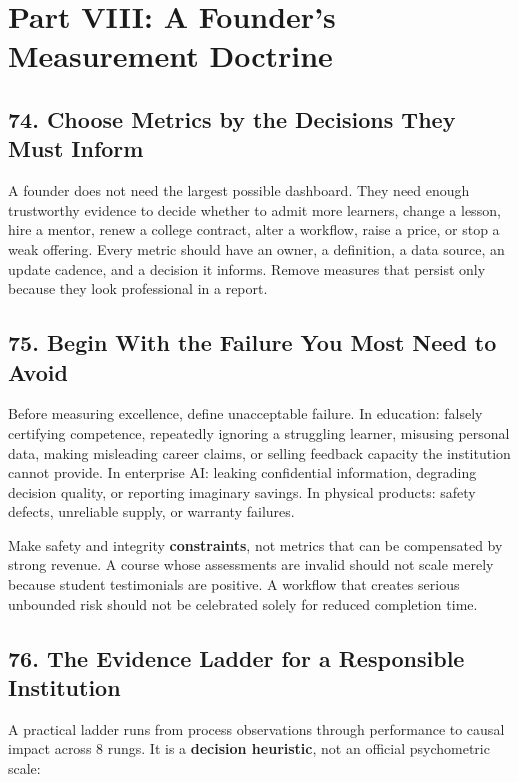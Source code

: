 \section*{Part VIII: A Founder's Measurement Doctrine}

\subsection*{74. Choose Metrics by the Decisions They Must Inform}

A founder does not need the largest possible dashboard. They need enough trustworthy evidence to decide whether to admit more learners, change a lesson, hire a mentor, renew a college contract, alter a workflow, raise a price, or stop a weak offering. Every metric should have an owner, a definition, a data source, an update cadence, and a decision it informs. Remove measures that persist only because they look professional in a report.

\subsection*{75. Begin With the Failure You Most Need to Avoid}

Before measuring excellence, define unacceptable failure. In education: falsely certifying competence, repeatedly ignoring a struggling learner, misusing personal data, making misleading career claims, or selling feedback capacity the institution cannot provide. In enterprise AI: leaking confidential information, degrading decision quality, or reporting imaginary savings. In physical products: safety defects, unreliable supply, or warranty failures.

Make safety and integrity \textbf{constraints}, not metrics that can be compensated by strong revenue. A course whose assessments are invalid should not scale merely because student testimonials are positive. A workflow that creates serious unbounded risk should not be celebrated solely for reduced completion time.

\subsection*{76. The Evidence Ladder for a Responsible Institution}

A practical ladder runs from process observations through performance to causal impact across 8 rungs. It is a \textbf{decision heuristic}, not an official psychometric scale:

